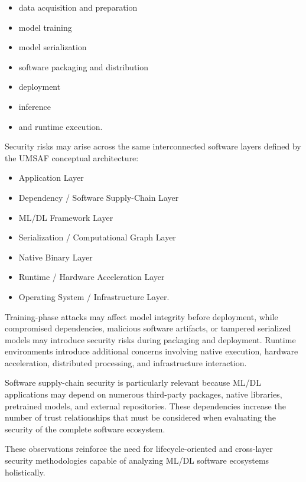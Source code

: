 \documentclass[
  12pt,
  letterpaper,
  oneside]{report}
\providecommand{\tightlist}{%
  \setlength{\itemsep}{0pt}\setlength{\parskip}{0pt}}
\begin{document}
\begin{itemize}
\tightlist
\item
  data acquisition and preparation
\item
  model training
\item
  model serialization
\item
  software packaging and distribution
\item
  deployment
\item
  inference
\item
  and runtime execution.
\end{itemize}

Security risks may arise across the same interconnected software layers
defined by the UMSAF conceptual architecture:

\begin{itemize}
\tightlist
\item
  Application Layer
\item
  Dependency / Software Supply-Chain Layer
\item
  ML/DL Framework Layer
\item
  Serialization / Computational Graph Layer
\item
  Native Binary Layer
\item
  Runtime / Hardware Acceleration Layer
\item
  Operating System / Infrastructure Layer.
\end{itemize}

Training-phase attacks may affect model integrity before deployment,
while compromised dependencies, malicious software artifacts, or
tampered serialized models may introduce security risks during packaging
and deployment. Runtime environments introduce additional concerns
involving native execution, hardware acceleration, distributed
processing, and infrastructure interaction.
\cite{kellas2025pickleball,digregorio2026insecurity,zhu2025mymodel,gan2025sentry}

Software supply-chain security is particularly relevant because ML/DL
applications may depend on numerous third-party packages, native
libraries, pretrained models, and external repositories. These
dependencies increase the number of trust relationships that must be
considered when evaluating the security of the complete software
ecosystem.\cite{tan2026securing,zhou2025unraveling,meiklejohn2025modelsupplychain}

These observations reinforce the need for lifecycle-oriented and
cross-layer security methodologies capable of analyzing ML/DL software
ecosystems holistically.
\end{document}
